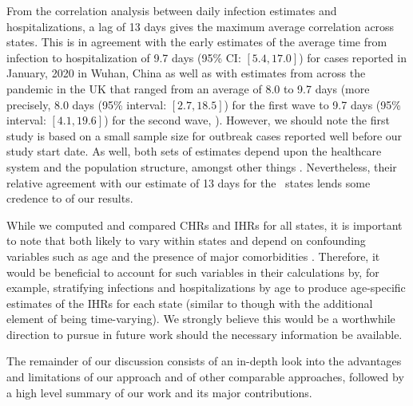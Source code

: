 \documentclass{article}
\begin{document}
From the correlation analysis between daily infection estimates and
hospitalizations, a lag of 13 days gives the maximum average correlation 
across states. This is in agreement with the early estimates of the average time from
infection to hospitalization of 9.7 days (95\% CI: $[5.4, 17.0]$) for
cases reported in January, 2020 in Wuhan, China as well as with estimates from
across the pandemic in the UK that ranged from an average of 8.0 to 9.7
days (more precisely, 8.0 days (95\% interval: $[2.7, 18.5]$) for the first
wave to 9.7 days (95\% interval: $[4.1, 19.6]$) for the second wave,
\citep{ward2021understanding}). However, we should note the first study is based
on a small sample size for outbreak cases reported well before our study start
date. As well, both sets of estimates depend upon the healthcare system and the
population structure, amongst other things \citep{ward2021understanding}.
Nevertheless, their relative agreement with our estimate of 13 days for the \US\
states lends some credence to of our results. 

While we computed and compared CHRs and IHRs for all states, 
it is important to note that both
likely to vary within states and depend on confounding variables such as
 age and the presence of major comorbidities \citep{russell2023comorbidities}.
 Therefore, it would be beneficial to account for such variables in their
 calculations by, for example, stratifying infections and hospitalizations by
 age to produce age-specific estimates of the IHRs for each state (similar to
 \citealp{fox2023disproportionate} though with the additional element of being
 time-varying). We strongly believe this would be a worthwhile direction to
 pursue in future work should the necessary information be available. 

The remainder of our discussion consists of an in-depth look into the advantages and
limitations of our approach and of other comparable approaches, followed by a
high level summary of our work and its major contributions. 
\end{document}
